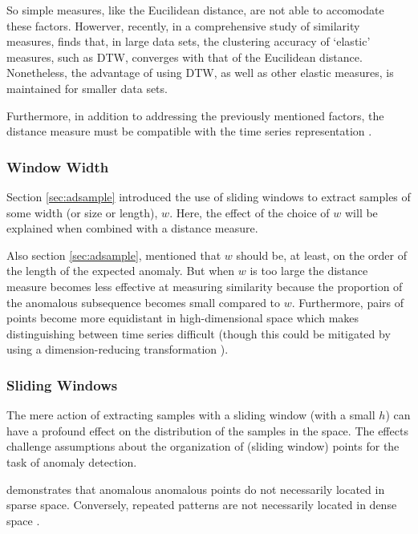 So simple measures, like the Eucilidean distance, are not able to accomodate these factors. Howerver, recently, in a comprehensive study of similarity measures, \cite{Wang2013} finds that, in large data sets, the clustering accuracy of `elastic' measures, such as DTW, converges with that of the Eucilidean distance. Nonetheless, the advantage of using DTW, as well as other elastic measures, is maintained for smaller data sets.

Furthermore, in addition to addressing the previously mentioned factors, the distance measure must be compatible with the time series representation \cite{Chakrabarti2002}. 


\subsubsection{Window Width}

Section \ref{sec:adsample} introduced the use of sliding windows to extract samples of some width (or size or length), $w$. Here, the effect of the choice of $w$ will be explained when combined with a distance measure.

Also section \ref{sec:adsample}, mentioned that $w$ should be, at least, on the order of the length of the expected anomaly. But when $w$ is too large the distance measure becomes less effective at measuring similarity because the proportion of the anomalous subsequence becomes small compared to $w$. Furthermore, pairs of points become more equidistant in high-dimensional space \cite{Hinneburg2000,Beyer1999} which makes distinguishing between time series difficult (though this could be mitigated by using a dimension-reducing transformation \cite{Keogh2001}).


\subsubsection{Sliding Windows}
\label{sec:sliding}

The mere action of extracting samples with a sliding window (with a small $h$) can have a profound effect on the distribution of the samples in the space. The effects challenge assumptions about the organization of (sliding window) points for the task of anomaly detection.

\cite{Keogh2005} demonstrates that anomalous anomalous points do not necessarily located in sparse space. Conversely, repeated patterns are not necessarily located in dense space \cite{kitaguchi2004extracting,Chiu2003,Bentley1997}.

